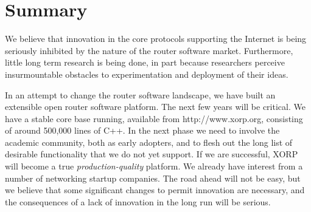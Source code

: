 
\section{Summary}




We believe that innovation in the core protocols supporting the
Internet is being seriously inhibited by the nature of the router
software market.  Furthermore, little long term research is being
done, in part because researchers perceive insurmountable obstacles to
experimentation and deployment of their ideas.

In an attempt to change the router software landscape, we have built
an extensible open router software platform.  The next few years will
be critical.  We have a stable core base running, available from
{\sf\small http://www.xorp.org}, consisting of
around 500,000 lines of C++.  In the next phase we need to involve the
academic community, both as early adopters, and to flesh out the long
list of desirable functionality that we do not yet support.  If we are
successful, XORP will become a true {\it production-quality} platform.
We already have interest from a number of networking startup
companies.  The road ahead will not be easy, but we believe that some
significant changes to permit innovation are necessary, and the
consequences of a lack of innovation in the long run will be serious.


